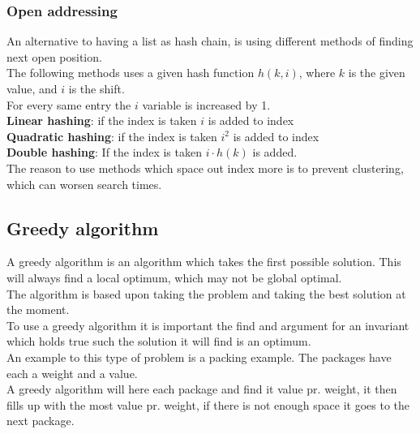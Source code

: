 \documentclass[12pt, a4paper]{article}
\begin{document}
				\subsubsection{Open addressing}
					An alternative to having a list as hash chain, is using different methods of finding next open position.\\
					The following methods uses a given hash function $h(k,i)$, where $k$ is the given value, and $i$ is the shift.\\
					For every same entry the $i$ variable is increased by 1.\\
					\textbf{Linear hashing}: if the index is taken $i$ is added to index\\
					\textbf{Quadratic hashing}: if the index is taken $i^2$ is added to index\\
					\textbf{Double hashing}: If the index is taken $i\cdot h(k)$ is added.\\
					The reason to use methods which space out index more is to prevent clustering, which can worsen search times.
			\subsection{Greedy algorithm}
				A greedy algorithm is an algorithm which takes the first possible solution. This will always find a local optimum, which may not be global optimal.\\
				The algorithm is based upon taking the problem and taking the best solution at the moment.\\
				To use a greedy algorithm it is important the find and argument for an invariant which holds true such the solution it will find is an optimum.\\[4mm]
				An example to this type of problem is a packing example. The packages have each a weight and a value.\\
				A greedy algorithm will here each package and find it value pr. weight, it then fills up with the most value pr. weight, if there is not enough space it goes to the next package.\\
\end{document}
